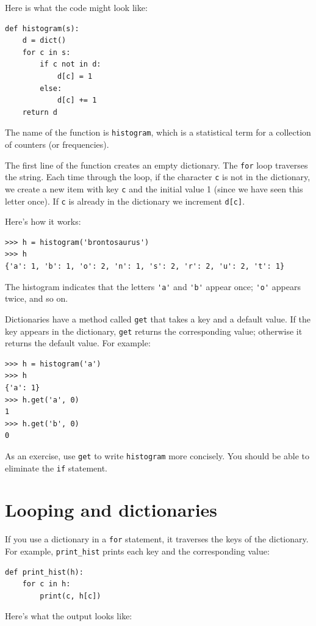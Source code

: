 \documentclass[10pt]{book}
\begin{document}
Here is what the code might look like:

\begin{verbatim}
def histogram(s):
    d = dict()
    for c in s:
        if c not in d:
            d[c] = 1
        else:
            d[c] += 1
    return d
\end{verbatim}
%
The name of the function is {\tt histogram}, which is a statistical
term for a collection of counters (or frequencies).

The first line of the
function creates an empty dictionary.  The {\tt for} loop traverses
the string.  Each time through the loop, if the character {\tt c} is
not in the dictionary, we create a new item with key {\tt c} and the
initial value 1 (since we have seen this letter once).  If {\tt c} is
already in the dictionary we increment {\tt d[c]}.

Here's how it works:

\begin{verbatim}
>>> h = histogram('brontosaurus')
>>> h
{'a': 1, 'b': 1, 'o': 2, 'n': 1, 's': 2, 'r': 2, 'u': 2, 't': 1}
\end{verbatim}
%
The histogram indicates that the letters \verb"'a'" and \verb"'b'"
appear once; \verb"'o'" appears twice, and so on.


Dictionaries have a method called {\tt get} that takes a key
and a default value.  If the key appears in the dictionary,
{\tt get} returns the corresponding value; otherwise it returns
the default value.  For example:

\begin{verbatim}
>>> h = histogram('a')
>>> h
{'a': 1}
>>> h.get('a', 0)
1
>>> h.get('b', 0)
0
\end{verbatim}
%
As an exercise, use {\tt get} to write {\tt histogram} more concisely.  You
should be able to eliminate the {\tt if} statement.


\section{Looping and dictionaries}

If you use a dictionary in a {\tt for} statement, it traverses
the keys of the dictionary.  For example, \verb"print_hist"
prints each key and the corresponding value:

\begin{verbatim}
def print_hist(h):
    for c in h:
        print(c, h[c])
\end{verbatim}
%
Here's what the output looks like:
\end{document}
